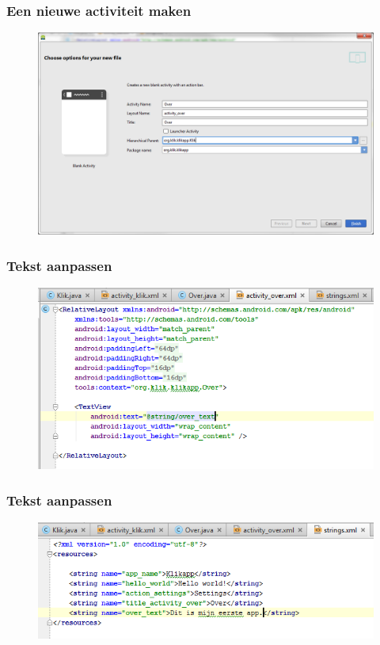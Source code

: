 \documentclass[11pt]{beamer}
\begin{document}
\begin{frame}
\frametitle{Een nieuwe activiteit maken}
\begin{figure}
\centering
\includegraphics[width=1.0\linewidth]{./newactivity3}
\label{fig:newactivity3}
\end{figure}
\end{frame}


\begin{frame}
\frametitle{Tekst aanpassen}
\begin{figure}
\centering
\includegraphics[width=1.0\linewidth]{./stringediting2}
\label{fig:stringediting1}
\end{figure}
\end{frame}

\begin{frame}
\frametitle{Tekst aanpassen}
\begin{figure}
\centering
\includegraphics[width=1.0\linewidth]{./stringediting}
\label{fig:stringediting2}
\end{figure}
\end{frame}
\end{document}
